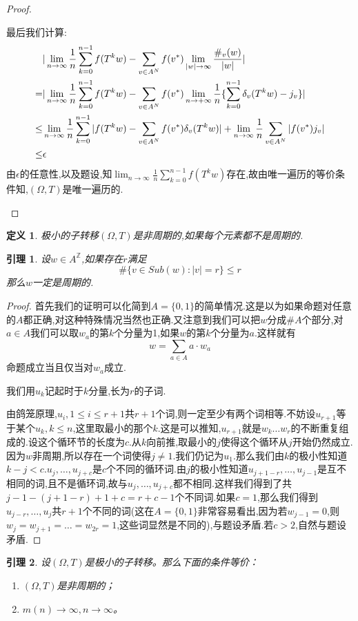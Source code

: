 \documentclass[a4paper,11pt,oneside]{book}
\newtheorem{lemma}{\textbf{\hspace{0.7cm}引理}}[section]
\newtheorem{definition}{\textbf{\hspace{0.7cm}定义}}[section]
\begin{document}
\begin{proof}
\begin{enumerate}[(i)]
最后我们计算:
\begin{align*}
&|\lim_{n\to \infty}\frac{1}{n}\sum_{k=0}^{n-1}f(T^kw)
-\sum_{v\in A^{N}}f(v^*)\lim_{|w| \to \infty}{\#_v(w)\over |w |}|\\
=&|\lim_{n\to \infty}\frac{1}{n}\sum_{k=0}^{n-1}f(T^kw)
-\sum_{v\in A^{N}}f(v^*)\lim_{n\to +\infty}\frac{1}{n}\{\sum_{k=0}^{n-1}\delta_v(T^kw)-j_v\}|\\
\leq&\lim_{n\to \infty}\frac{1}{n}\sum_{k=0}^{n-1}|f(T^kw)-\sum_{v\in A^N}f(v^*)\delta_v(T^kw)|+\lim_{n\to \infty}\frac{1}{n}\sum_{v\in A^N}|f(v^*)j_v|\\
\leq&\epsilon
\end{align*}
由$\epsilon$的任意性,以及题设,知$\lim_{n\to \infty}\frac{1}{n}\sum_{k=0}^{n-1}f(T^kw)$存在,故由唯一遍历的等价条件知,$(\Omega,T)$是唯一遍历的.

\end{enumerate}
\end{proof}


\begin{definition}
极小的子转移$(\Omega,T)$是非周期的,如果每个元素都不是周期的.
\end{definition}
\begin{lemma}
设$w\in A^{\mathbb{Z}}$,如果存在$r$满足
$$\#\{v\in Sub(w):|v|=r\}\leq r$$
那么$w$一定是周期的.
\end{lemma}
\begin{proof}
首先我们的证明可以化简到$A=\{0,1\}$的简单情况.这是以为如果命题对任意的$A$都正确,对这种特殊情况当然也正确.又注意到我们可以把$w$分成$\#A$个部分,对$a\in A$我们可以取$w_a$的第$k$个分量为1,如果$w$的第$k$个分量为$a$.这样就有
$$w=\sum_{a\in A} a\cdot w_a$$
命题成立当且仅当对$w_a$成立.


我们用$u_k$记起时于$k$分量,长为$r$的子词.

由鸽笼原理,$u_{i},1\leq i\leq r+1$共$r+1$个词,则一定至少有两个词相等.不妨设$u_{r+1}$等于某个$u_k,k\leq n$,这里取最小的那个$k$.这是可以推知,$u_{r+1}$就是$w_k\ldots w_r$的不断重复组成的.设这个循环节的长度为$c$.从$k$向前推,取最小的$j$使得这个循环从$j$开始仍然成立.因为$w$非周期,所以存在一个词使得$j\ne 1$.我们仍记为$u_1$.那么我们由$k$的极小性知道$k-j< c$.$u_j,\ldots ,u_{j+c}$是$c$个不同的循环词.由$j$的极小性知道$u_{j+1-r},\ldots ,u_{j-1}$是互不相同的词,且不是循环词,故与$u_j,\ldots ,u_{j+c}$都不相同.这样我们得到了共$j-1-(j+1-r)+1+c=r+c-1$个不同词.如果$c=1$,那么我们得到$u_{j-r},\ldots,u_j$共$r+1$个不同的词(这在$A=\{0,1\}$非常容易看出,因为若$w_{j-1}=0$,则$w_j=w_{j+1}=\ldots=w_{2r}=1$,这些词显然是不同的),与题设矛盾.若$c>2$,自然与题设矛盾.
\end{proof}
\begin{lemma}
\label{l:1}
设$(\Omega,T)$是极小的子转移。那么下面的条件等价：
\begin{enumerate}
\item $(\Omega,T)$是非周期的；
\item $m(n)\rightarrow \infty,n\rightarrow \infty$。
\end{enumerate}
\end{lemma}
\end{document}

